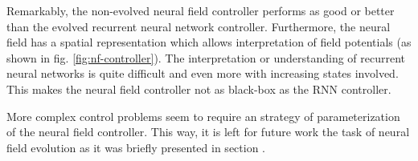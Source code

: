 \documentclass{sig-alternate}
\begin{document}
Remarkably, the non-evolved neural field controller performs as good
or better than the evolved recurrent neural network
controller. Furthermore, the neural field has a spatial representation
which allows interpretation of field potentials (as shown in
fig. \ref{fig:nf-controller}). The interpretation or understanding of
recurrent neural networks is quite difficult and even more with
increasing states involved. This makes the neural field controller not
as black-box as the RNN controller.

More complex control problems seem to require an strategy of
parameterization of the neural field controller. This way, it is left
for future work the task of neural field evolution as it was briefly
presented in section \label{sec:properties}.



\end{document}
